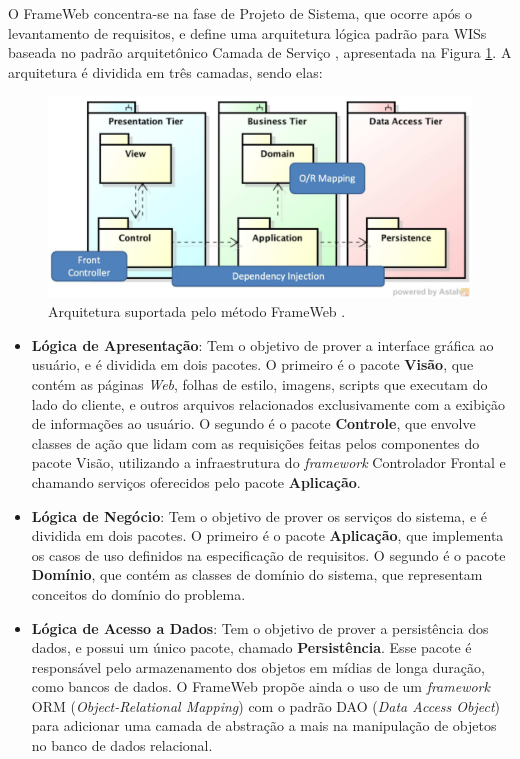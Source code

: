 O FrameWeb concentra-se na fase de Projeto de Sistema, que ocorre após o levantamento
de requisitos, e define uma arquitetura lógica padrão para WISs baseada no padrão 
arquitetônico Camada de Serviço \cite{fowler:2002}, apresentada na Figura \ref{fig-arquitetura-frameweb}.
A arquitetura é dividida em três camadas, sendo elas:

\begin{figure}
    \centering
    \includegraphics[width=.9\textwidth]{figuras/fig-arquitetura-frameweb.png} 
    \caption{Arquitetura suportada pelo método FrameWeb \cite{souza:2020}.}
    \label{fig-arquitetura-frameweb}
\end{figure}


\begin{itemize}
    \item \textbf{Lógica de Apresentação}: Tem o objetivo de prover a interface gráfica
        ao usuário, e é dividida em dois pacotes. O primeiro é o pacote \textbf{Visão},
        que contém as páginas \textit{Web}, folhas de estilo, imagens, scripts que executam do lado do cliente,
        e outros arquivos relacionados exclusivamente com a exibição de informações ao usuário.
        O segundo é o pacote \textbf{Controle}, que envolve classes de ação que lidam com as requisições
        feitas pelos componentes do pacote Visão, utilizando a infraestrutura do \textit{framework} 
        Controlador Frontal e chamando serviços oferecidos pelo pacote \textbf{Aplicação}.

    \item \textbf{Lógica de Negócio}: Tem o objetivo de prover os serviços do sistema, e é dividida
        em dois pacotes. O primeiro é o pacote \textbf{Aplicação}, que implementa os casos de uso 
        definidos na especificação de requisitos. O segundo é o pacote \textbf{Domínio}, que contém 
        as classes de domínio do sistema, que representam conceitos do domínio do problema. 

    \item \textbf{Lógica de Acesso a Dados}: Tem o objetivo de prover a persistência dos dados, e 
        possui um único pacote, chamado \textbf{Persistência}. Esse pacote é responsável pelo armazenamento
        dos objetos em mídias de longa duração, como bancos de dados. O FrameWeb propõe ainda o uso de um
        \textit{framework} ORM (\textit{Object-Relational Mapping}) com o padrão DAO (\textit{Data Access Object}) \cite{alur:2003}
        para adicionar uma camada de abstração a mais na manipulação de objetos no banco de dados relacional.
\end{itemize}

